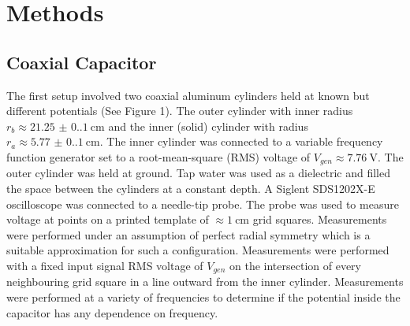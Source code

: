\documentclass[10pt, twocolumn]{article}
\theoremstyle{definition}
\begin{document}
\section{Methods}
\subsection{Coaxial Capacitor}
The first setup involved two coaxial
aluminum cylinders held at known but different potentials (See Figure 1). The outer cylinder
with inner radius $r_b\approx\qty{21.25(0.1)}{\centi\meter}$ and the inner (solid) cylinder with radius
$r_a\approx\qty{5.77(0.1)}{\centi\meter}$. The inner cylinder was connected to a variable frequency
function generator set to a root-mean-square (RMS) voltage of $V_{gen}\approx\qty{7.76}{\volt}$.
The outer cylinder was held at ground. Tap water was used as a dielectric and filled the space between the cylinders
at a constant depth.
A Siglent SDS1202X-E oscilloscope was connected to a needle-tip probe. The probe was
used to measure voltage at points on a printed template of $\approx\qty{1}{\centi\meter}$ grid squares.
Measurements were performed under an assumption of perfect radial symmetry
which is a suitable approximation for such a configuration. Measurements
were performed with a fixed input signal RMS voltage of $V_{gen}$ on the intersection of
every neighbouring grid square in a line outward from the inner cylinder. Measurements
were performed at a variety of frequencies to determine if the potential inside the capacitor
has any dependence on frequency.
\end{document}
